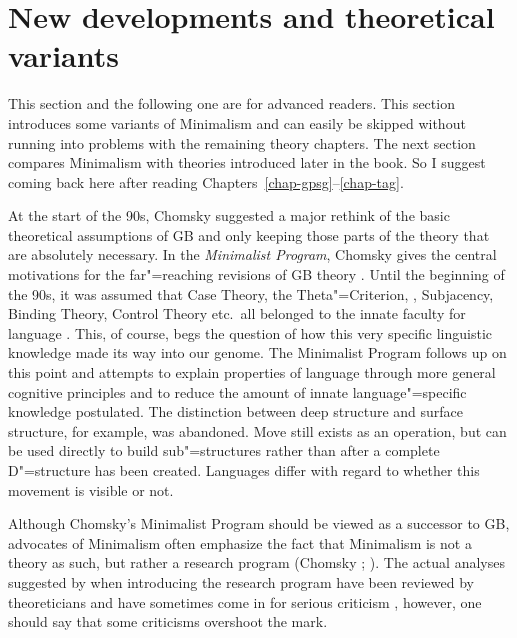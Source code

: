 \section{New developments and theoretical variants}
\label{Abschnitt-neues-GB}

This section and the following one are for advanced readers. This section introduces some variants
of Minimalism and can easily be skipped without running into problems with the remaining theory
chapters. The next section compares Minimalism with theories introduced later in the book. So
I suggest coming back here after reading Chapters~\ref{chap-gpsg}--\ref{chap-tag}.


At the start of the 90s, Chomsky suggested a major rethink of the basic theoretical assumptions of GB and only keeping
those parts of the theory that are absolutely necessary. In the \emph{Minimalist Program}, Chomsky gives the central motivations for the far"=reaching
revisions of GB theory \citep{Chomsky93b-u,Chomsky95a-u}. Until the beginning of the 90s, it was
assumed that Case Theory, the Theta"=Criterion, \xbart, Subjacency, Binding
Theory, Control Theory etc.\ all belonged to the innate faculty
for language \citep[]{Richards2015a}. This, of 
course, begs the question of how this very specific linguistic knowledge made its way into our genome. The Minimalist Program follows up on this
point and attempts to explain properties of language through more general cognitive principles and to reduce the amount of innate language"=specific 
knowledge postulated. The distinction between deep structure and surface structure, for example, was abandoned.
Move still exists as an operation, but can be used directly to build sub"=structures rather than after a complete D"=structure has been created.
Languages differ with regard to whether this movement is visible or not.

Although Chomsky's Minimalist Program should be viewed as a successor to GB, advocates of Minimalism often emphasize the fact that Minimalism is not
a theory as such, but rather a research program (Chomsky \citeyear[]{Chomsky2007a};
\citeyear[]{Chomsky2013a}). The actual analyses suggested by \citet{Chomsky95a-u} when introducing the research program have been reviewed by theoreticians and have sometimes come in for serious criticism
\citep*{Kolb97a,JL97a-u,JL99a-u,LLJ2000b,LLJ2000a,LLJ2001a,Seuren2004a,PJ2005a},
however, one should say that some criticisms overshoot the mark.

